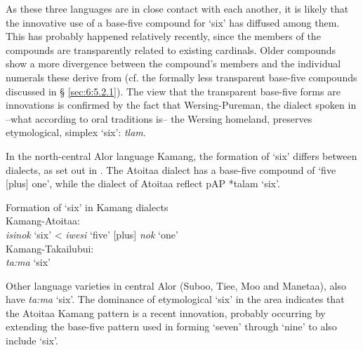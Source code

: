  

  

  

As these three languages are in close contact with each another, it is likely that the innovative  use of a base-five compound for `six' has diffused among them. This has probably happened relatively recently, since the members of the compounds are transparently related to existing cardinals. Older compounds show a more divergence between the compound's members and the individual numerals these derive from (cf. the formally less transparent base-five compounds discussed in {\S} \ref{sec:6:5.2.1}). The view that the transparent base-five forms are innovations is confirmed by the fact that Wersing-Pureman, the dialect spoken in --what according to oral traditions is-- the Wersing homeland, preserves etymological, simplex `six': \textit{t{\textschwa}lam}.

In the north-central Alor language Kamang, the formation of `six' differs between dialects, as set out in . The Atoitaa dialect has a base-five compound of `five [plus] one', while the dialect of Atoitaa reflect p\textsc{AP} *talam `six'. 



\ea%
\label{ex:6:5}
Formation of `six' in Kamang dialects\\
 Kamang{}-Atoitaa: \\
\textit{isi}\textit{{\ng}}\textit{nok}\textbf{} `six'     {\textless} \textit{iwesi}\textit{{\ng}} `five' [plus] \textit{nok} `one'\\
    Kamang{}-Takailubui:\\
    \textit{ta:ma} `six'      \\ 
\z





Other language varieties in central Alor (Suboo, Tiee, Moo and Manetaa), also have \textit{ta:ma} `six'. The dominance of etymological `six' in the area indicates that the Atoitaa Kamang pattern is a recent innovation, probably occurring by extending the base-five pattern used in forming `seven' through `nine' to also include `six'. 

